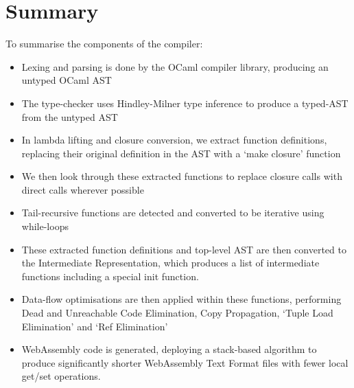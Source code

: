 \documentclass[12pt,twoside,notitlepage]{report}
\begin{document}
\section{Summary}
To summarise the components of the compiler:
\begin{itemize}
	\item Lexing and parsing is done by the OCaml compiler library, producing an untyped OCaml AST
	\item The type-checker uses Hindley-Milner type inference to produce a typed-AST from the untyped AST
	\item In lambda lifting and closure conversion, we extract function definitions, replacing their original definition in the AST with a `make closure' function
	\item We then look through these extracted functions to replace closure calls with direct calls wherever possible
	\item Tail-recursive functions are detected and converted to be iterative using while-loops
	\item These extracted function definitions and top-level AST are then converted to the Intermediate Representation, which produces a list of intermediate functions including a special init function.
	\item Data-flow optimisations are then applied within these functions, performing Dead and Unreachable Code Elimination, Copy Propagation, `Tuple Load Elimination' and `Ref Elimination'
	\item WebAssembly code is generated, deploying a stack-based algorithm to produce significantly shorter WebAssembly Text Format files with fewer local get/set operations.
\end{itemize}
\end{document}
